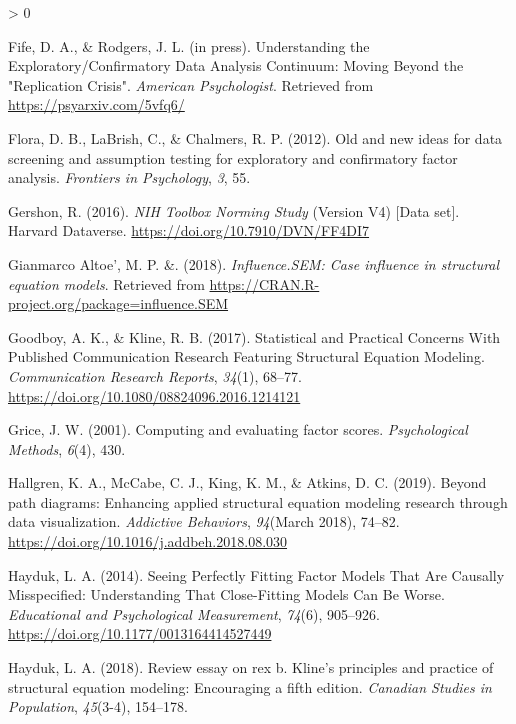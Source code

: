 \documentclass[
  english,
  man]{apa6}
\newlength{\cslhangindent}
\newenvironment{CSLReferences}[2] %
 {%
  \setlength{\parindent}{0pt}
  \ifodd #1 \everypar{\setlength{\hangindent}{\cslhangindent}}\ignorespaces\fi
  \ifnum #2 > 0
  \setlength{\parskip}{#2\baselineskip}
  \fi
 }%
 {}
\begin{document}
\begin{CSLReferences}{1}{0}
\leavevmode\hypertarget{ref-Fife2019a}{}%
Fife, D. A., \& Rodgers, J. L. (in press). {Understanding the Exploratory/Confirmatory Data Analysis Continuum: Moving Beyond the "Replication Crisis"}. \emph{American Psychologist}. Retrieved from \url{https://psyarxiv.com/5vfq6/}

\leavevmode\hypertarget{ref-flora2012old}{}%
Flora, D. B., LaBrish, C., \& Chalmers, R. P. (2012). Old and new ideas for data screening and assumption testing for exploratory and confirmatory factor analysis. \emph{Frontiers in Psychology}, \emph{3}, 55.

\leavevmode\hypertarget{ref-toolboxData}{}%
Gershon, R. (2016). \emph{{NIH Toolbox Norming Study}} (Version V4) {[}Data set{]}. Harvard Dataverse. \url{https://doi.org/10.7910/DVN/FF4DI7}

\leavevmode\hypertarget{ref-influenceSEM}{}%
Gianmarco Altoe', M. P. \&. (2018). \emph{Influence.SEM: Case influence in structural equation models}. Retrieved from \url{https://CRAN.R-project.org/package=influence.SEM}

\leavevmode\hypertarget{ref-Goodboy2017}{}%
Goodboy, A. K., \& Kline, R. B. (2017). {Statistical and Practical Concerns With Published Communication Research Featuring Structural Equation Modeling}. \emph{Communication Research Reports}, \emph{34}(1), 68--77. \url{https://doi.org/10.1080/08824096.2016.1214121}

\leavevmode\hypertarget{ref-grice2001computing}{}%
Grice, J. W. (2001). Computing and evaluating factor scores. \emph{Psychological Methods}, \emph{6}(4), 430.

\leavevmode\hypertarget{ref-Hallgren2019a}{}%
Hallgren, K. A., McCabe, C. J., King, K. M., \& Atkins, D. C. (2019). {Beyond path diagrams: Enhancing applied structural equation modeling research through data visualization}. \emph{Addictive Behaviors}, \emph{94}(March 2018), 74--82. \url{https://doi.org/10.1016/j.addbeh.2018.08.030}

\leavevmode\hypertarget{ref-Hayduk2014}{}%
Hayduk, L. A. (2014). {Seeing Perfectly Fitting Factor Models That Are Causally Misspecified: Understanding That Close-Fitting Models Can Be Worse}. \emph{Educational and Psychological Measurement}, \emph{74}(6), 905--926. \url{https://doi.org/10.1177/0013164414527449}

\leavevmode\hypertarget{ref-hayduk2018review}{}%
Hayduk, L. A. (2018). Review essay on rex b. Kline's principles and practice of structural equation modeling: Encouraging a fifth edition. \emph{Canadian Studies in Population}, \emph{45}(3-4), 154--178.


\end{CSLReferences}
\end{document}
